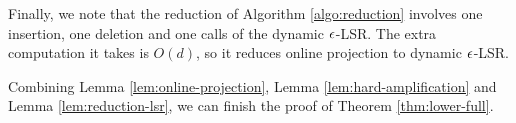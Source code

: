 Finally, we note that the reduction of Algorithm \ref{algo:reduction} involves one insertion, one deletion and one calls of the dynamic $\epsilon$-LSR. 
The extra computation it takes is $O(d)$, so it reduces online projection to dynamic $\epsilon$-LSR.

Combining Lemma \ref{lem:online-projection}, Lemma \ref{lem:hard-amplification} and Lemma \ref{lem:reduction-lsr}, we can finish the proof of Theorem \ref{thm:lower-full}.



